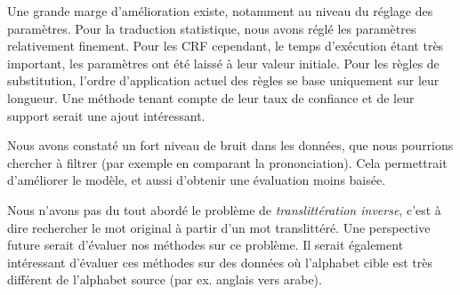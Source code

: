 \documentclass{article}
\begin{document}
Une grande marge d'amélioration existe, notamment au niveau du réglage des paramètres. Pour la traduction statistique, nous avons réglé les paramètres relativement finement. Pour les CRF cependant, le temps d'exécution étant très important, les paramètres ont été laissé à leur valeur initiale. Pour les règles de substitution, l'ordre d'application actuel des règles se base uniquement sur leur longueur. Une méthode tenant compte de leur taux de confiance et de leur support serait une ajout intéressant. 

Nous avons constaté un fort niveau de bruit dans les données, que nous pourrions chercher à filtrer (par exemple en comparant la prononciation). Cela permettrait d'améliorer le modèle, et aussi d'obtenir une évaluation moins baisée.

Nous n'avons pas du tout abordé le problème de \emph{translittération inverse}, c'est à dire rechercher le mot original à partir d'un mot translittéré. Une perspective future serait d'évaluer nos méthodes sur ce problème. Il serait également intéressant d'évaluer ces méthodes sur des données où l'alphabet cible est très différent de l'alphabet source (par ex. anglais vers arabe).



\end{document}
